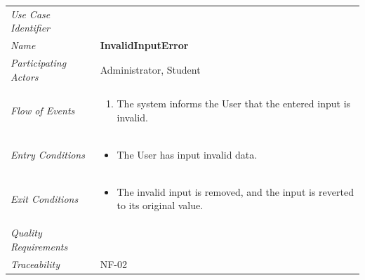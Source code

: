 \documentclass[12pt,letterpaper]{article}
\begin{document}
\begin{center}
	\begin{tabu} to 
		\toprule
		Use Case Identifier & \invalidinputerror{} \\
		Name & {\bf InvalidInputError} \\
		Participating Actors & Administrator, Student \\
		Flow of Events & 
		\begin{minipage}[t]{\linewidth}
		    \begin{enumerate}
			    \item The system informs the User that the entered input is invalid.
			\end{enumerate}
		\end{minipage} \\

		Entry Conditions &
		\begin{minipage}[t]{\linewidth}
			\begin{itemize}
			    \item The User has input invalid data.
	        \end{itemize}
		\end{minipage} \\

		Exit Conditions &
		\begin{minipage}[t]{\linewidth}
			\begin{itemize}
			    \item The invalid input is removed, and the input is reverted to its original value.
	        \end{itemize}
		\end{minipage} \\

		Quality Requirements & \\

		Traceability & NF-02 \\
		\toprule
	\end{tabu}
\end{center}
\end{document}
